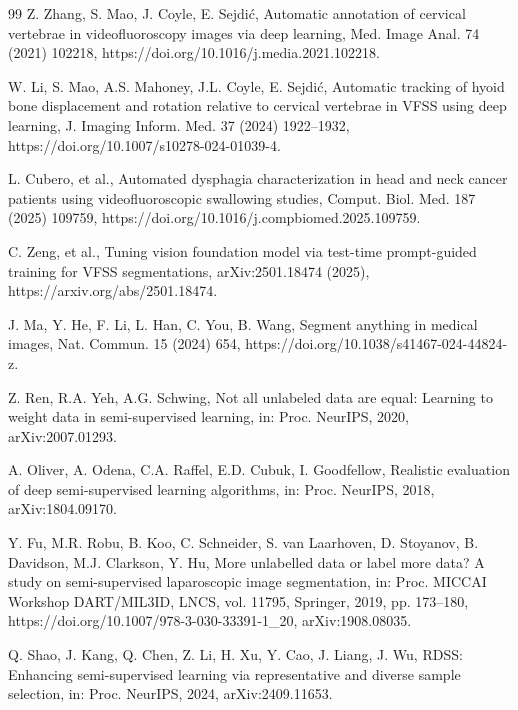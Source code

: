 \documentclass[a4paper,fleqn]{cas-dc}
\begin{document}
\begin{thebibliography}{99}
Z. Zhang, S. Mao, J. Coyle, E. Sejdi\'{c},
Automatic annotation of cervical vertebrae in videofluoroscopy images via deep learning,
Med. Image Anal. 74 (2021) 102218, https://doi.org/10.1016/j.media.2021.102218.

W. Li, S. Mao, A.S. Mahoney, J.L. Coyle, E. Sejdi\'{c},
Automatic tracking of hyoid bone displacement and rotation relative to cervical vertebrae in VFSS using deep learning,
J. Imaging Inform. Med. 37 (2024) 1922--1932, https://doi.org/10.1007/s10278-024-01039-4.

L. Cubero, et al.,
Automated dysphagia characterization in head and neck cancer patients using videofluoroscopic swallowing studies,
Comput. Biol. Med. 187 (2025) 109759, https://doi.org/10.1016/j.compbiomed.2025.109759.

C. Zeng, et al.,
Tuning vision foundation model via test-time prompt-guided training for VFSS segmentations,
arXiv:2501.18474 (2025), https://arxiv.org/abs/2501.18474.

J. Ma, Y. He, F. Li, L. Han, C. You, B. Wang,
Segment anything in medical images,
Nat. Commun. 15 (2024) 654, https://doi.org/10.1038/s41467-024-44824-z.

Z. Ren, R.A. Yeh, A.G. Schwing,
Not all unlabeled data are equal: Learning to weight data in semi-supervised learning,
in: Proc. NeurIPS, 2020, arXiv:2007.01293.

A. Oliver, A. Odena, C.A. Raffel, E.D. Cubuk, I. Goodfellow,
Realistic evaluation of deep semi-supervised learning algorithms,
in: Proc. NeurIPS, 2018, arXiv:1804.09170.

Y. Fu, M.R. Robu, B. Koo, C. Schneider, S. van Laarhoven, D. Stoyanov, B. Davidson, M.J. Clarkson, Y. Hu,
More unlabelled data or label more data? A study on semi-supervised laparoscopic image segmentation,
in: Proc. MICCAI Workshop DART/MIL3ID, LNCS, vol. 11795, Springer, 2019, pp. 173--180, https://doi.org/10.1007/978-3-030-33391-1\_20, arXiv:1908.08035.

Q. Shao, J. Kang, Q. Chen, Z. Li, H. Xu, Y. Cao, J. Liang, J. Wu,
RDSS: Enhancing semi-supervised learning via representative and diverse sample selection,
in: Proc. NeurIPS, 2024, arXiv:2409.11653.


\end{thebibliography}
\end{document}
